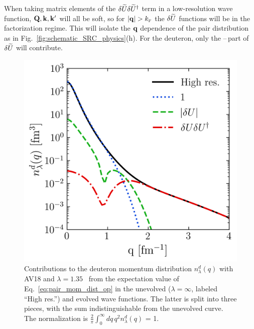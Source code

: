 \documentclass[10pt,aps,prc,floatfix,twocolumn,nofootinbib]{revtex4-1}
\begin{document}
When taking matrix elements of the $\delta \widetilde U\delta \widetilde U^{\dagger}$ term in a low-resolution wave function, $\mathbf{Q},\mathbf{k},\mathbf{k}'$ will all be soft, so for $|\mathbf{q}| > k_{\scriptscriptstyle{\text F}}$ the $\delta \widetilde U$ functions will be in the factorization regime.
This will isolate the $\mathbf{q}$ dependence of the pair distribution as in Fig.~\ref{fig:schematic_SRC_physics}(h).
For the deuteron, only the \Striplet--\Dtriplet\,part of $\delta \widetilde U$ will contribute.


\begin{figure}[t]
    \centering
    \includegraphics[width=0.8\columnwidth]{figures_low_res/n_lambda_deuteron_decomposition_kvnn_6_lamb_1p35_kmax_15p0_curves_4.png}
    \caption{Contributions to the deuteron momentum distribution $n_\lambda^d(q)$ with AV18 and $\lambda=1.35$ \fmi\, from the expectation value of Eq.~\eqref{eq:pair_mom_dist_op} in the unevolved ($\lambda = \infty$, labeled ``High res.'') and evolved wave functions. The latter is split into three pieces, with the sum indistinguishable from the unevolved curve. The normalization  is $\frac{2}{\pi} \int_0^{\infty} dq\, q^2 n^d_{\lambda}(q)$ = 1.}
    \label{fig:deuteron_md_contributions}
\end{figure}
\end{document}
